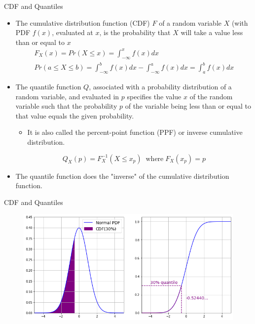 \documentclass{beamer}
\begin{document}
\begin{frame}{CDF and Quantiles}
	\begin{itemize}
    \item The cumulative distribution function (CDF) $F$ of a random variable $X$ (with PDF $f(x)$, evaluated at $x$, is the probability that $X$ will take a value less than or equal to $x$
    \begin{equation*}
        \begin{gathered}
            F_X(x) = Pr(X\leq x) = \int_{-\infty}^{x} f(x)dx\\
            Pr(a \leq X\leq b) = \int_{-\infty}^{b} f(x)dx - \int_{-\infty}^{a} f(x)dx = \int_{a}^{b} f(x)dx
        \end{gathered}
    \end{equation*}
    
    \item The quantile function $Q$, associated with a probability distribution of a random variable, and evaluated in $p$ specifies the value $x$ of the random variable such that the probability $p$ of the variable being less than or equal to that value equals the given probability. 
    \begin{itemize}
        \item It is also called the percent-point function (PPF) or inverse cumulative distribution.
    \end{itemize}
    \begin{equation*}    
        Q_X(p) = F_X^{-1}(X \leq x_p)\;\;\textrm{where}\; F_X(x_p) = p
    \end{equation*}
    
    \item The quantile function does the "inverse" of the cumulative distribution function.
	\end{itemize}
\end{frame}

\begin{frame}{CDF and Quantiles}
    \begin{figure}[h]
    \begin{center}
    \includegraphics[width=0.7\linewidth]{cdf_quantiles}
    \end{center}
    \end{figure}    
\end{frame}
\end{document}
